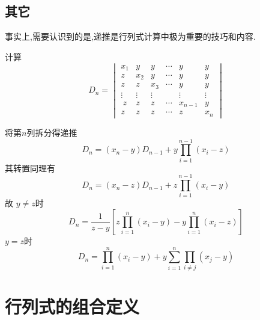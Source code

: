 \subsection{其它}
事实上,需要认识到的是,递推是行列式计算中极为重要的技巧和内容.

\begin{brown}
    \begin{problem}
计算
\[
D_n=\begin{vmatrix}
    x_1 & y & y & \cdots &y & y\\
    z&x_2&y&\cdots&y&y\\
    z& z&x_3&\cdots&y&y\\
    \vdots&\vdots&\vdots&&\vdots&\vdots\\\
    z&z&z&\cdots&x_{n-1}&y\\
    z&z&z&\cdots&z&x_n
\end{vmatrix}
\]
\end{problem}
\begin{solution}
将第$n$列拆分得递推
\[
D_n=\left(x_n-y\right)D_{n-1}+y\prod_{i=1}^{n-1}\left(x_i-z\right)
\]
其转置同理有
\[
D_n=\left(x_n-z\right)D_{n-1}+z\prod_{i=1}^{n-1}\left(x_i-y\right)
\]
故
$y \neq z$时
\[
D_n=
\frac{1}{z-y}\left[
    z\prod_{i=1}
    ^{n}\left(x_i-y\right)-y
    \prod_{i=1}^{n}\left(x_i-z\right)
    \right]
\]
$y=z$时
\[
D_n=
\prod_{i=1}^{n}\left(x_i-y\right)+y\sum_{i=1}^{n}\prod_{i\neq j}
\left(x_j-y\right)
\]
\end{solution}
\end{brown}
\newpage
\section{行列式的组合定义}
